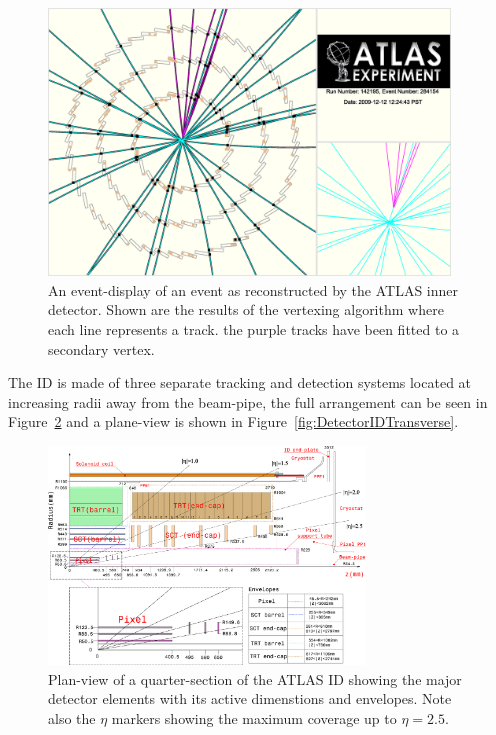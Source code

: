 \begin{figure}[htbp]
  \centering
  \includegraphics[width=0.95\textwidth]{PartDetector/Diagrams/fig_14.eps}
  \caption{An event-display of an event as reconstructed by the ATLAS inner detector. Shown are the results of the vertexing algorithm where each line represents a track. the purple tracks have been fitted to a secondary vertex.}
  \label{fig:label}
\end{figure}

The ID is made of three separate tracking and detection systems located at increasing radii away from the beam-pipe, the full arrangement can be seen in Figure~\ref{fig:DetectorIDQuarter} and a plane-view is shown in Figure~\ref{fig:DetectorIDTransverse}.

\begin{figure}[htbp]
  \centering
  \includegraphics[width=0.75\textwidth]{PartDetector/Diagrams/Detector_ID_QuarterView.eps}
  \caption{Plan-view of a quarter-section of the ATLAS ID showing the major detector elements with its active dimenstions and envelopes. Note also the $\eta$ markers showing the maximum coverage up to $\eta=2.5$.}
  \label{fig:DetectorIDQuarter}
\end{figure}

